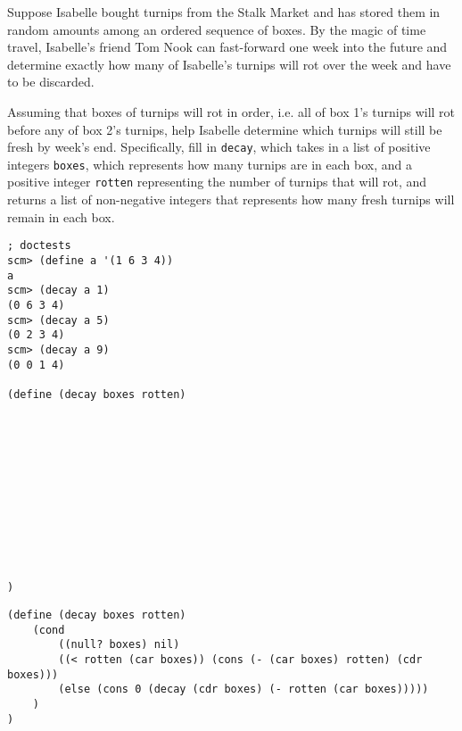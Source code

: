 \begin{blocksection}
\question
Suppose Isabelle bought turnips from the Stalk Market and has stored them in random amounts among an ordered sequence of boxes. By the magic of time travel, Isabelle's friend Tom Nook can fast-forward one week into the future and determine exactly how many of Isabelle's turnips will rot over the week and have to be discarded.

Assuming that boxes of turnips will rot in order, i.e. all of box 1's turnips will rot before any of box 2's turnips, help Isabelle determine which turnips will still be fresh by week's end. Specifically, fill in \lstinline{decay}, which takes in a list of positive integers \lstinline{boxes}, which represents how many turnips are in each box, and a positive integer \lstinline{rotten} representing the number of turnips that will rot, and returns a list of non-negative integers that represents how many fresh turnips will remain in each box.

\begin{lstlisting}
; doctests
scm> (define a '(1 6 3 4))
a
scm> (decay a 1)
(0 6 3 4)
scm> (decay a 5)
(0 2 3 4)
scm> (decay a 9)
(0 0 1 4)

(define (decay boxes rotten)












)
\end{lstlisting}
\end{blocksection}

\begin{blocksection}
\begin{solution}
\begin{lstlisting}
(define (decay boxes rotten)
    (cond 
        ((null? boxes) nil)
        ((< rotten (car boxes)) (cons (- (car boxes) rotten) (cdr boxes)))
        (else (cons 0 (decay (cdr boxes) (- rotten (car boxes)))))
    )
)
\end{lstlisting}
\end{solution}
\end{blocksection}